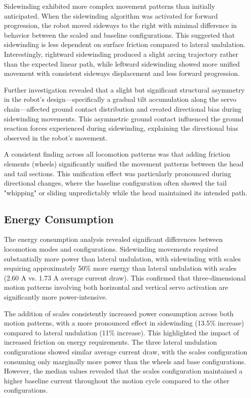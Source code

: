 \documentclass[12pt,a4paper]{report}
\begin{document}
Sidewinding exhibited more complex movement patterns than initially anticipated. When the sidewinding algorithm was activated for forward progression, the robot moved sideways to the right with minimal difference in behavior between the scaled and baseline configurations. This suggested that sidewinding is less dependent on surface friction compared to lateral undulation. Interestingly, rightward sidewinding produced a slight arcing trajectory rather than the expected linear path, while leftward sidewinding showed more unified movement with consistent sideways displacement and less forward progression.

Further investigation revealed that a slight but significant structural asymmetry in the robot's design—specifically a gradual tilt accumulation along the servo chain—affected ground contact distribution and created directional bias during sidewinding movements. This asymmetric ground contact influenced the ground reaction forces experienced during sidewinding, explaining the directional bias observed in the robot's movement.

A consistent finding across all locomotion patterns was that adding friction elements (wheels) significantly unified the movement patterns between the head and tail sections. This unification effect was particularly pronounced during directional changes, where the baseline configuration often showed the tail "whipping" or sliding unpredictably while the head maintained its intended path.

\subsection{Energy Consumption}
\label{subsec:energy_findings}

The energy consumption analysis revealed significant differences between locomotion modes and configurations. Sidewinding movements required substantially more power than lateral undulation, with sidewinding with scales requiring approximately 50\% more energy than lateral undulation with scales (2.60 A vs. 1.73 A average current draw). This confirmed that three-dimensional motion patterns involving both horizontal and vertical servo activation are significantly more power-intensive.

The addition of scales consistently increased power consumption across both motion patterns, with a more pronounced effect in sidewinding (13.5\% increase) compared to lateral undulation (11\% increase). This highlighted the impact of increased friction on energy requirements. The three lateral undulation configurations showed similar average current draw, with the scales configuration consuming only marginally more power than the wheels and base configurations. However, the median values revealed that the scales configuration maintained a higher baseline current throughout the motion cycle compared to the other configurations.
\end{document}
